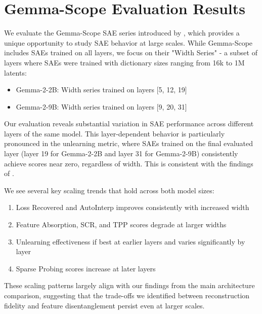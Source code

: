 \documentclass{article}
\theoremstyle{plain}
\theoremstyle{definition}
\theoremstyle{remark}
\begin{document}
\clearpage
\section{Gemma-Scope Evaluation Results}
\label{app:gemma_scope_eval_results}
We evaluate the Gemma-Scope SAE series introduced by \citet{lieberum2024gemmascopeopensparse}, which provides a unique opportunity to study SAE behavior at large scales. While Gemma-Scope includes SAEs trained on all layers, we focus on their "Width Series" - a subset of layers where SAEs were trained with dictionary sizes ranging from 16k to 1M latents:

\begin{itemize}
\item Gemma-2-2B: Width series trained on layers [5, 12, 19]
\item Gemma-2-9B: Width series trained on layers [9, 20, 31]
\end{itemize}

Our evaluation reveals substantial variation in SAE performance across different layers of the same model. This layer-dependent behavior is particularly pronounced in the unlearning metric, where SAEs trained on the final evaluated layer (layer 19 for Gemma-2-2B and layer 31 for Gemma-2-9B) consistently achieve scores near zero, regardless of width. This is consistent with the findings of \citet{farrell2024applyingsparseautoencodersunlearn}.

We see several key scaling trends that hold across both model sizes:
\begin{enumerate}
\item Loss Recovered and AutoInterp improves consistently with increased width
\item Feature Absorption, SCR, and TPP scores degrade at larger widths
\item Unlearning effectiveness if best at earlier layers and varies significantly by layer
\item Sparse Probing scores increase at later layers
\end{enumerate}

These scaling patterns largely align with our findings from the main architecture comparison, suggesting that the trade-offs we identified between reconstruction fidelity and feature disentanglement persist even at larger scales.
\end{document}
